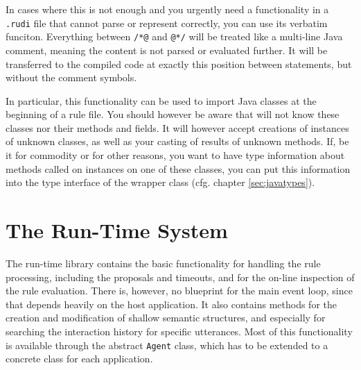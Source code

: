 %
In cases where this is not enough and you urgently need a functionality in a \texttt{.rudi} file that \vonda cannot parse or represent correctly, you can use its verbatim funciton. Everything between \verb|/*@| and \verb|@*/| will be treated like a multi-line Java comment, meaning the content is not parsed or evaluated further. It will be transferred to the compiled code at exactly this position between statements, but without the comment symbols.


In particular, this functionality can be used to import Java classes at the beginning of a rule file. You should however be aware that \vonda will not know these classes nor their methods and fields. It will however accept creations of instances of unknown classes, as well as your casting of results of unknown methods. If, be it for commodity or for other reasons, you want \vonda to have type information about methods called on instances on one of these classes, you can put this information into the type interface of the wrapper class (cfg. chapter \ref{sec:javatypes}).

\section{The Run-Time System}

The run-time library contains the basic functionality for handling the rule
processing, including the proposals and timeouts, and for the on-line
inspection of the rule evaluation. There is, however, no blueprint for the main
event loop, since that depends heavily on the host application. It also
contains methods for the creation and modification of shallow semantic
structures, and especially for searching the interaction history for specific
utterances. Most of this functionality is available through the abstract
\texttt{Agent} class, which has to be extended to a concrete class for each
application.

